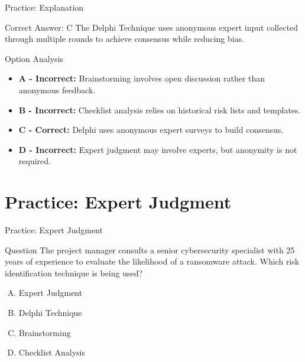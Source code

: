\documentclass{beamer}
\begin{document}
	\begin{frame}{Practice: Explanation}
		\begin{block}{Correct Answer: C}
			The Delphi Technique uses anonymous expert input collected through multiple rounds to achieve consensus while reducing bias.
		\end{block}
		\begin{block}{Option Analysis}
			\begin{itemize}
				\item \textbf{A - Incorrect:} Brainstorming involves open discussion rather than anonymous feedback.
				\item \textbf{B - Incorrect:} Checklist analysis relies on historical risk lists and templates.
				\item \textbf{C - Correct:} Delphi uses anonymous expert surveys to build consensus.
				\item \textbf{D - Incorrect:} Expert judgment may involve experts, but anonymity is not required.
			\end{itemize}
		\end{block}
	\end{frame}
	
	\section{Practice: Expert Judgment}
	
	\begin{frame}{Practice: Expert Judgment}
		\begin{block}{Question}
			The project manager consults a senior cybersecurity specialist with 25 years of experience to evaluate the likelihood of a ransomware attack. Which risk identification technique is being used?
		\end{block}
		\begin{enumerate}[(A)]
			\item Expert Judgment
			\item Delphi Technique
			\item Brainstorming
			\item Checklist Analysis
		\end{enumerate}
	\end{frame}
	
\end{document}
